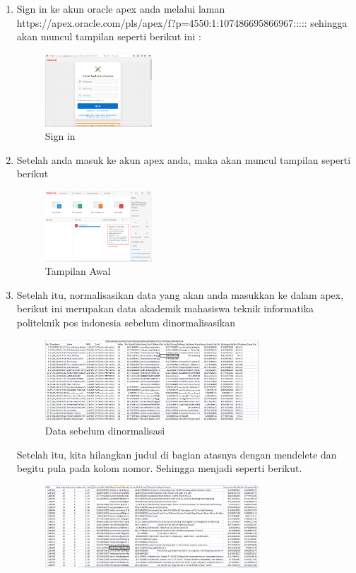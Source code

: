 \begin{enumerate}
	\item Sign in ke akun oracle apex anda melalui laman https://apex.oracle.com/pls/apex/f?p=4550:1:107486695866967::::: sehingga akan muncul tampilan seperti berikut ini :
		\begin{figure}[H]
		\includegraphics[width=4cm]{figures/signin.png}
		\centering
		\caption{Sign in}
		\end{figure}
	\item Setelah anda masuk ke akun apex anda, maka akan muncul tampilan seperti berikut
		\begin{figure}[H]
		\includegraphics[width=4cm]{figures/2.png}
		\centering
		\caption{Tampilan Awal}
		\end{figure}
	\item Setelah itu, normalisasikan data yang akan anda masukkan ke dalam apex, berikut ini merupakan data akademik mahasiswa teknik informatika politeknik pos indonesia sebelum dinormalisasikan
				\begin{figure}[H]
				\includegraphics[width=8cm]{figures/3.png}
				\centering
				\caption{Data sebelum dinormalisasi}
				\end{figure}
		Setelah itu, kita hilangkan judul di bagian atasnya dengan mendelete dan begitu pula pada kolom nomor. Sehingga menjadi seperti berikut. 
				\begin{figure}[H]
				\includegraphics[width=8cm]{figures/normalisasi.png}

\end{figure}
\end{enumerate}
